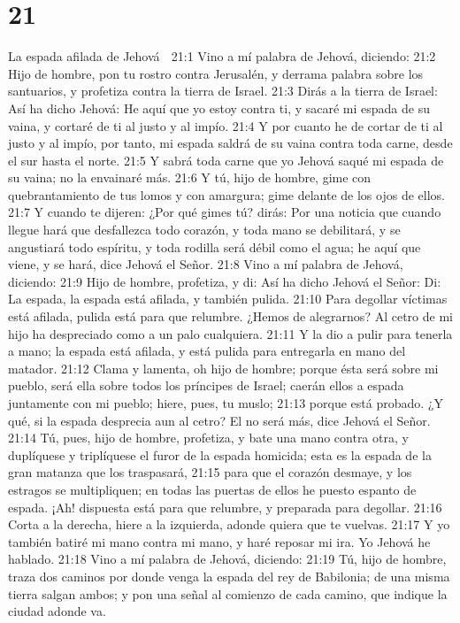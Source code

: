 \chapter{21}

La espada afilada de Jehová  

21:1 Vino a mí palabra de Jehová, diciendo:  
21:2 Hijo de hombre, pon tu rostro contra Jerusalén, y derrama palabra sobre los santuarios, y profetiza contra la tierra de Israel.  
21:3 Dirás a la tierra de Israel: Así ha dicho Jehová: He aquí que yo estoy contra ti, y sacaré mi espada de su vaina, y cortaré de ti al justo y al impío.  
21:4 Y por cuanto he de cortar de ti al justo y al impío, por tanto, mi espada saldrá de su vaina contra toda carne, desde el sur hasta el norte.  
21:5 Y sabrá toda carne que yo Jehová saqué mi espada de su vaina; no la envainaré más.  
21:6 Y tú, hijo de hombre, gime con quebrantamiento de tus lomos y con amargura; gime delante de los ojos de ellos.  
21:7 Y cuando te dijeren: ¿Por qué gimes tú? dirás: Por una noticia que cuando llegue hará que desfallezca todo corazón, y toda mano se debilitará, y se angustiará todo espíritu, y toda rodilla será débil como el agua; he aquí que viene, y se hará, dice Jehová el Señor.  
21:8 Vino a mí palabra de Jehová, diciendo:  
21:9 Hijo de hombre, profetiza, y di: Así ha dicho Jehová el Señor: Di: La espada, la espada está afilada, y también pulida.  
21:10 Para degollar víctimas está afilada, pulida está para que relumbre. ¿Hemos de alegrarnos? Al cetro de mi hijo ha despreciado como a un palo cualquiera.  
21:11 Y la dio a pulir para tenerla a mano; la espada está afilada, y está pulida para entregarla en mano del matador.  
21:12 Clama y lamenta, oh hijo de hombre; porque ésta será sobre mi pueblo, será ella sobre todos los príncipes de Israel; caerán ellos a espada juntamente con mi pueblo; hiere, pues, tu muslo;  
21:13 porque está probado. ¿Y qué, si la espada desprecia aun al cetro? El no será más, dice Jehová el Señor.  
21:14 Tú, pues, hijo de hombre, profetiza, y bate una mano contra otra, y duplíquese y triplíquese el furor de la espada homicida; esta es la espada de la gran matanza que los traspasará,  
21:15 para que el corazón desmaye, y los estragos se multipliquen; en todas las puertas de ellos he puesto espanto de espada. ¡Ah! dispuesta está para que relumbre, y preparada para degollar.  
21:16 Corta a la derecha, hiere a la izquierda, adonde quiera que te vuelvas.  
21:17 Y yo también batiré mi mano contra mi mano, y haré reposar mi ira. Yo Jehová he hablado.  
21:18 Vino a mí palabra de Jehová, diciendo:  
21:19 Tú, hijo de hombre, traza dos caminos por donde venga la espada del rey de Babilonia; de una misma tierra salgan ambos; y pon una señal al comienzo de cada camino, que indique la ciudad adonde va.  
